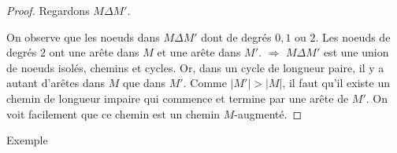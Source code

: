 \begin{mytheo} [Berge]
\begin{proof}
     Regardons $ M \Delta M'$.

\begin{center}
\end{center}

     On observe que les noeuds dans $ M \Delta M'$ dont de degrés $0,1$ ou $2$. Les noeuds de degrés $2$ ont une arête dans $M$ et une arête dans $M'$. $\Rightarrow$ $ M \Delta M'$ est une union de noeuds isolés, chemins et cycles. Or, dans un cycle de longueur paire, il y a autant d'arêtes dans $M$ que dans $M'$. Comme  $ |M'| > |M| $, il faut qu'il existe un chemin de longueur impaire qui commence et termine par une arête de $M'$. On voit facilement que ce chemin est un chemin $M$-augmenté.

  \end{proof}
\end{mytheo}
\begin{myexem}
  Exemple \addTODO
\end{myexem}

